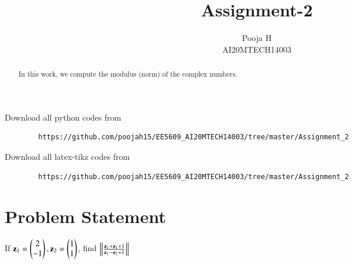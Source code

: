 \documentclass[journal,12pt,twocolumn]{IEEEtran}
\begin{document}
	\makeatother
	\let\StandardTheFigure\thefigure
	\let\vec\mathbf
	\renewcommand{\thefigure}{\theproblem}
	\def\putbox#1#2#3{\makebox[0in][l]{\makebox[#1][l]{}\raisebox{\baselineskip}[0in][0in]{\raisebox{#2}[0in][0in]{#3}}}}
	\def\rightbox#1{\makebox[0in][r]{#1}}
	\def\centbox#1{\makebox[0in]{#1}}
	\def\topbox#1{\raisebox{-\baselineskip}[0in][0in]{#1}}
	\def\midbox#1{\raisebox{-0.5\baselineskip}[0in][0in]{#1}}
	\vspace{3cm}
	\title{Assignment-2}
	\author{Pooja H \\ AI20MTECH14003}
	\maketitle
	\newpage
	\bigskip
	\renewcommand{\thefigure}{\theenumi}
	\renewcommand{\thetable}{\theenumi}
	\begin{abstract}
		In this work, we compute the modulus (norm) of the complex numbers.
	\end{abstract}
	Download all python codes from 
	\begin{lstlisting}
		https://github.com/poojah15/EE5609_AI20MTECH14003/tree/master/Assignment_2
	\end{lstlisting}
	Download all latex-tikz codes from 
	\begin{lstlisting}
		https://github.com/poojah15/EE5609_AI20MTECH14003/tree/master/Assignment_2
	\end{lstlisting}
	\section{Problem Statement}
	If $\vec{z}_1 = \myvec{2 \\ -1}, \vec{z}_2 = \myvec{1 \\ 1}$, find $\norm{\frac{\vec{z}_1 + \vec{z}_1 + 1}{\vec{z}_1-\vec{z}_2+1}}$ 
\end{document}
